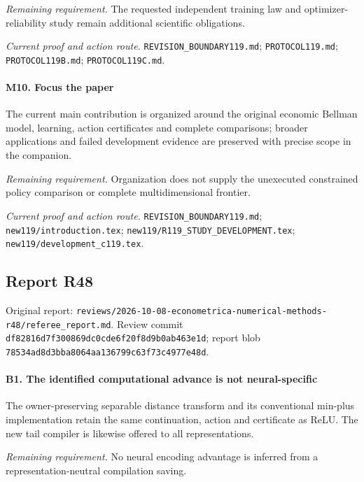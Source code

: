 \par\emph{Remaining requirement.} The requested independent training law and optimizer-reliability study remain additional scientific obligations.

\par\emph{Current proof and action route.} \nolinkurl{REVISION_BOUNDARY119.md}; \nolinkurl{PROTOCOL119.md}; \nolinkurl{PROTOCOL119B.md}; \nolinkurl{PROTOCOL119C.md}.

\paragraph{M10. Focus the paper}

The current main contribution is organized around the original economic Bellman model, learning, action certificates and complete comparisons; broader applications and failed development evidence are preserved with precise scope in the companion.

\par\emph{Remaining requirement.} Organization does not supply the unexecuted constrained policy comparison or complete multidimensional frontier.

\par\emph{Current proof and action route.} \nolinkurl{REVISION_BOUNDARY119.md}; \nolinkurl{new119/introduction.tex}; \nolinkurl{new119/R119_STUDY_DEVELOPMENT.tex}; \nolinkurl{new119/development_c119.tex}.

\subsection{Report R48}

Original report: \nolinkurl{reviews/2026-10-08-econometrica-numerical-methods-r48/referee_report.md}. Review commit \nolinkurl{df82816d7f300869dc0cde6f20f8d9b0ab463e1d}; report blob \nolinkurl{78534ad8d3bba8064aa136799c63f73c4977e48d}.

\paragraph{B1. The identified computational advance is not neural-specific}

The owner-preserving separable distance transform and its conventional min-plus implementation retain the same continuation, action and certificate as ReLU. The new tail compiler is likewise offered to all representations.

\par\emph{Remaining requirement.} No neural encoding advantage is inferred from a representation-neutral compilation saving.

